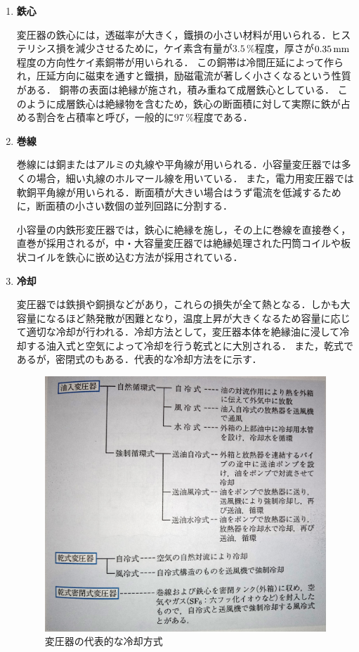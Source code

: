 \begin{enumerate}
	\item \textbf{鉄心}
	
	変圧器の鉄心には，透磁率が大きく，鐵損の小さい材料が用いられる．ヒステリシス損を減少させるために，ケイ素含有量が$3.5\,\%$程度，厚さが$0.35\,\rm{mm}$程度の方向性ケイ素銅帯が用いられる．
	この銅帯は冷間圧延によって作られ，圧延方向に磁束を通すと鐵損，励磁電流が著しく小さくなるという性質がある．
	銅帯の表面は絶縁が施され，積み重ねて成層鉄心としている．
	このように成層鉄心は絶縁物を含むため，鉄心の断面積に対して実際に鉄が占める割合を占積率と呼び，一般的に$97\,\%$程度である．
	\item \textbf{巻線}
	
	巻線には銅またはアルミの丸線や平角線が用いられる．小容量変圧器では多くの場合，細い丸線のホルマール線を用いている．
	また，電力用変圧器では軟銅平角線が用いられる．断面積が大きい場合はうず電流を低減するために，断面積の小さい数個の並列回路に分割する．
	
	小容量の内鉄形変圧器では，鉄心に絶縁を施し，その上に巻線を直接巻く，直巻が採用されるが，中・大容量変圧器では絶縁処理された円筒コイルや板状コイルを鉄心に嵌め込む方法が採用されている．
	\item \textbf{冷却}
	
	変圧器では鉄損や銅損などがあり，これらの損失が全て熱となる．しかも大容量になるほど熱発散が困難となり，温度上昇が大きくなるため容量に応じて適切な冷却が行われる．冷却方法として，変圧器本体を絶縁油に浸して冷却する油入式と空気によって冷却を行う乾式とに大別される．
	また，乾式であるが，密閉式のもある．代表的な冷却方法をに示す．
	\begin{figure}[h]
	\centering
	\includegraphics[scale=0.45]{./fig/kind.pdf}
	\caption{変圧器の代表的な冷却方式}
	\label{fig:cool}
\end{figure}
\end{enumerate}

